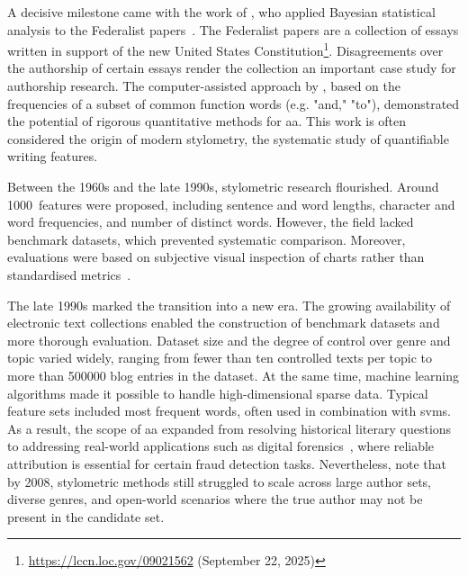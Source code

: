 

A decisive milestone came with the work of \citet{mosteller_1964}, who applied Bayesian statistical analysis to the Federalist papers~\citep{hamilton_federalist_1787}.
The Federalist papers are a collection of essays written in support of the new United States Constitution\footnote{\url{https://lccn.loc.gov/09021562} (September 22, 2025)}.
Disagreements over the authorship of certain essays render the collection an important case study for authorship research.
The computer-assisted approach by \citet{mosteller_1964}, based on the frequencies of a subset of common function words (e.g. "and," "to"), demonstrated the potential of rigorous quantitative methods for \ac{aa}. 
This work is often considered the origin of modern stylometry, the systematic study of quantifiable writing features.

Between the 1960s and the late 1990s, stylometric research flourished.
Around \num{1000}~features were proposed, including sentence and word lengths, character and word frequencies, and number of distinct words. 
However, the field lacked benchmark datasets, which prevented systematic comparison. 
Moreover, evaluations were based on subjective visual inspection of charts rather than standardised metrics~\citep{stamatatos_survey_2009}.

The late 1990s marked the transition into a new era. 
The growing availability of electronic text collections enabled the construction of benchmark datasets and more thorough evaluation. 
Dataset size and the degree of control over genre and topic varied widely, ranging from fewer than ten controlled texts per topic to more than \num{500000} blog entries in the \dataBlog{} dataset. %
At the same time, machine learning algorithms made it possible to handle high-dimensional sparse data. 
Typical feature sets included most frequent words, often used in combination with \acp{svm}.
As a result, the scope of \ac{aa} expanded from resolving historical literary questions to addressing real-world applications such as digital forensics~\citep{stamatatos_survey_2009}, where reliable attribution is essential for certain fraud detection tasks.
Nevertheless, \citet{abbasi_writeprints_2008} note that by 2008, stylometric methods still struggled to scale across large author sets, diverse genres, and open-world scenarios where the true author may not be present in the candidate set.


